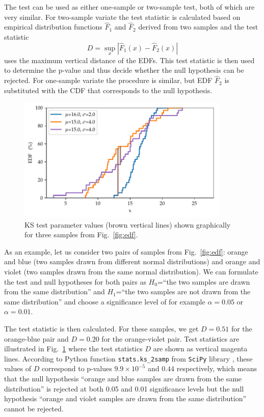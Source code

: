 \documentclass[english, twoside]{HYgradu}
\begin{document}
The test can be used as either one-sample or two-sample test, both of which are very similar. For two-sample variate the test statistic is calculated based on empirical distribution functions $\hat{F}_1$ and $\hat{F}_2$ derived from two samples and the test statistic
\begin{equation}
	D = \sup_{x} |\hat{F}_1(x) - \hat{F}_2(x)|
\end{equation}
uses the maximum vertical distance of the EDFs. This test statistic is then used to determine the p-value and thus decide whether the null hypothesis can be rejected. For one-sample variate the procedure is similar, but EDF $\hat{F}_2$ is substituted with the CDF that corresponds to the null hypothesis.

\begin{figure}
   \centering
   \includegraphics[width=0.9\textwidth]{kuvat/kstest.pdf}
   \caption{KS test parameter values (brown vertical lines) shown graphically for three samples from Fig.\ \ref{fig:edf}.}
   \label{fig:ks} 
\end{figure}

As an example, let us consider two pairs of samples from Fig.\ \ref{fig:edf}: orange and blue (two samples drawn from different normal distributions) and orange and violet (two samples drawn from the same normal distribution). We can formulate the test and null hypotheses for both pairs as $H_0$=``the two samples are drawn from the same distribution'' and $H_1$=``the two samples are not drawn from the same distribution'' and choose a significance level of for example $\alpha=0.05$ or $\alpha=0.01$.

The test statistic is then calculated. For these samples, we get $D=0.51$ for the orange-blue pair and $D=0.20$ for the orange-violet pair. Test statistics are illustrated in Fig.\ \ref{fig:ks} where the test statistics $D$ are shown as vertical magenta lines. According to Python function \texttt{stats.ks\_2samp} from \texttt{SciPy} library \citep{scipy}, these values of $D$ correspond to p-values $9.9\times 10^{-5}$ and $0.44$ respectively, which means that the null hypothesis ``orange and blue samples are drawn from the same distribution'' is rejected at both 0.05 and 0.01 significance levels but the null hypothesis ``orange and violet samples are drawn from the same distribution'' cannot be rejected.
\end{document}
